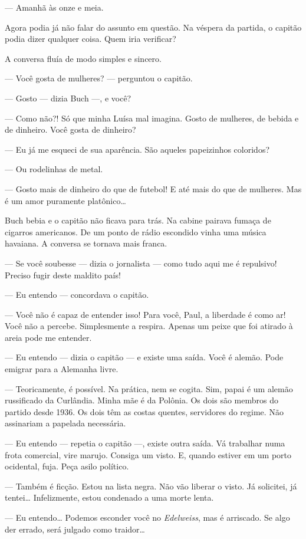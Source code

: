 --- Amanhã às onze e meia.

Agora podia já não falar do assunto em questão. Na véspera da partida, o
capitão podia dizer qualquer coisa. Quem iria verificar?

A conversa fluía de modo simples e sincero.

--- Você gosta de mulheres? --- perguntou o capitão.

--- Gosto --- dizia Buch ---, e você?

--- Como não?! Só que minha Luísa mal imagina. Gosto de mulheres, de
bebida e de dinheiro. Você gosta de dinheiro?

--- Eu já me esqueci de sua aparência. São aqueles papeizinhos
coloridos?

--- Ou rodelinhas de metal.

--- Gosto mais de dinheiro do que de futebol! E até mais do que de
mulheres. Mas é um amor puramente platônico\ldots{}

Buch bebia e o capitão não ficava para trás. Na cabine pairava fumaça de
cigarros americanos. De um ponto de rádio escondido vinha uma música
havaiana. A conversa se tornava mais franca.

--- Se você soubesse --- dizia o jornalista --- como tudo aqui me é
repulsivo! Preciso fugir deste maldito país!

--- Eu entendo --- concordava o capitão.

--- Você não é capaz de entender isso! Para você, Paul, a liberdade é
como ar! Você não a percebe. Simplesmente a respira. Apenas um peixe que
foi atirado à areia pode me entender.

--- Eu entendo --- dizia o capitão --- e existe uma saída. Você é
alemão. Pode emigrar para a Alemanha livre.

--- Teoricamente, é possível. Na prática, nem se cogita. Sim, papai é um
alemão russificado da Curlândia. Minha mãe é da Polônia. Os dois são
membros do partido desde 1936. Os dois têm as costas quentes, servidores
do regime. Não assinariam a papelada necessária.

--- Eu entendo --- repetia o capitão ---, existe outra saída. Vá
trabalhar numa frota comercial, vire marujo. Consiga um visto. E, quando
estiver em um porto ocidental, fuja. Peça asilo político.

--- Também é ficção. Estou na lista negra. Não vão liberar o visto. Já
solicitei, já tentei\ldots{} Infelizmente, estou condenado a uma morte lenta.

--- Eu entendo\ldots{} Podemos esconder você no \emph{Edelweiss}, mas é
arriscado. Se algo der errado, será julgado como traidor\ldots{}


